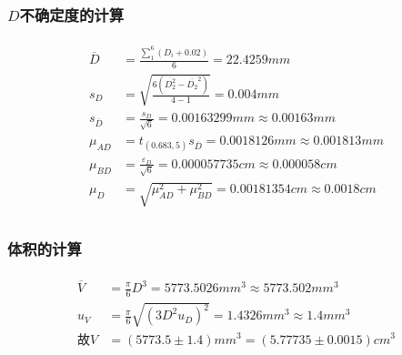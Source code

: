 \documentclass[12pt,a4paper,UTF8]{ctexart}
\begin{document}
\subsubsection*{$D$不确定度的计算}
\begin{align*}
	\begin{aligned}
	\overline{D}&=\frac{\sum_{1}^{6}(D_i+0.02)}{6}=22.4259mm\\
	s_{D}&=\sqrt{\frac{6(\overline{D_2^2}-\overline{D_2}^2)}{4-1}}=0.004mm\\
	s_{\overline{D}} &= \frac{s_{D}}{\sqrt{6}} = 0.00163299mm\approx 0.00163mm\\
	\mu_{AD} &= t_{(0.683,5)}s_{\overline{D}} = 0.0018126mm\approx0.001813mm\\
	\mu_{BD} &= \frac{\varepsilon_{D}}{\sqrt{6}} = 0.000057735cm\approx 0.000058cm\\
	\mu_{D} &= \sqrt{\mu_{AD}^2+\mu_{BD}^2}=0.00181354cm\approx 0.0018cm\\
	\end{aligned}
\end{align*}
\subsubsection*{体积的计算}
\begin{align*}
	\begin{aligned}
		\overline{V}&=\frac{\pi}{6}D^{3} = 5773.5026mm^3\approx 5773.502mm^3\\
		u_{V}&=\frac{\pi}{6}\sqrt{(3D^{2}u_{D})^{2}} = 1.4326mm^3\approx 1.4mm^3\\
		\text{故}V &= (5773.5 \pm 1.4)mm^3 = (5.77735 \pm 0.0015)cm^3
	\end{aligned}
\end{align*}
\end{document}
